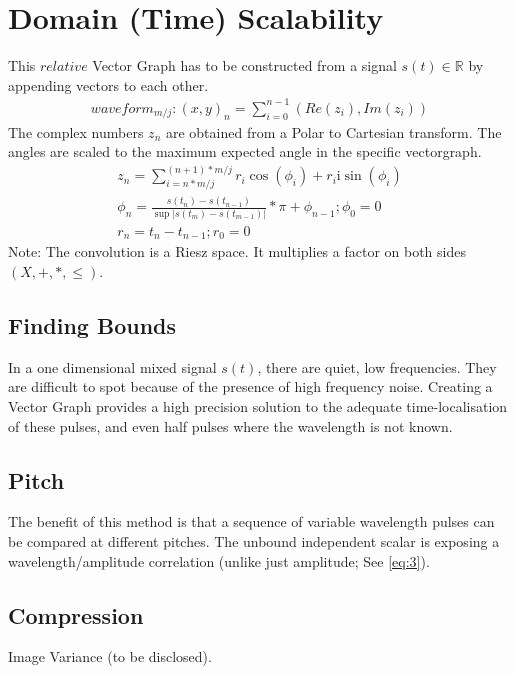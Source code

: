 \documentclass{report}
\begin{document}
\section{Domain (Time) Scalability}
This $relative$ Vector Graph has to be constructed from a signal $s(t)\in \mathbb{R}$ by appending vectors to each other.
\begin{align}
waveform_{m/j}: (x,y)_{n}=\sum \limits _{i=0}^{n-1}(Re(z_{i}),Im(z_{i}))
\end{align}
The complex numbers $z_{n}$ are obtained from a Polar to Cartesian transform. The angles are scaled to the maximum expected angle in the specific vectorgraph.
\begin{align}
z_{n}=\sum \limits _{i=n*m/j}^{(n+1)*m/j}r_{i}\cos(\phi_{i})+r_{i}\mathrm{i}\sin(\phi_{i})\\
\phi_{n}=\frac{s(t_{n})-s(t_{n-1})}{\sup \lvert s(t_{m})-s(t_{m-1}) \rvert}*\pi+\phi_{n-1};\phi_{0}=0\\
r_{n}=t_{n}-t_{n-1};r_{0}=0
\end{align}
Note: The convolution is a Riesz space. It multiplies a factor on both sides $(X,+,*,\leq)$.
\subsection{Finding Bounds}
In a one dimensional mixed signal $s(t)$, there are quiet, low frequencies. They are difficult to spot because of the presence of high frequency noise. Creating a Vector Graph provides a high precision solution to the adequate time-localisation of these pulses, and even half pulses where the wavelength is not known.
\subsection{Pitch}
The benefit of this method is that a sequence of variable wavelength pulses can be compared at different pitches. The unbound independent scalar is exposing a wavelength/amplitude correlation (unlike just amplitude; See \eqref{eq:3}).
\subsection{Compression}
Image Variance (to be disclosed).
\end{document}
